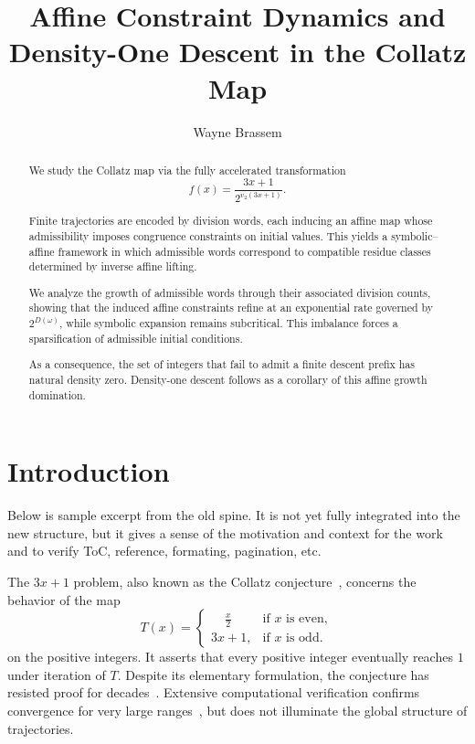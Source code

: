 \documentclass[12pt, oneside]{article}
\title{Affine Constraint Dynamics and Density-One Descent in the Collatz Map}
\author{Wayne Brassem}
\numberwithin{equation}{section}
\theoremstyle{definition}
\theoremstyle{plain}
\theoremstyle{remark}
\begin{document}


\maketitle

\begin{abstract}

We study the Collatz map via the fully accelerated transformation
\[
f(x)=\frac{3x+1}{2^{v_2(3x+1)}}.
\]

Finite trajectories are encoded by division words, each inducing an affine map
whose admissibility imposes congruence constraints on initial values. This
yields a symbolic--affine framework in which admissible words correspond to
compatible residue classes determined by inverse affine lifting.

We analyze the growth of admissible words through their associated division
counts, showing that the induced affine constraints refine at an exponential
rate governed by $2^{D(\omega)}$, while symbolic expansion remains subcritical.
This imbalance forces a sparsification of admissible initial conditions.

As a consequence, the set of integers that fail to admit a finite descent prefix
has natural density zero. Density-one descent follows as a corollary of this
affine growth domination.

\end{abstract}

\newpage
\tableofcontents

\newpage
\section{Introduction}

Below is sample excerpt from the old spine. It is not yet fully integrated into
the new structure, but it gives a sense of the motivation and context for the work and
to verify ToC, reference, formating, pagination, etc.

The $3x+1$ problem, also known as the Collatz conjecture~\cite{Collatz1937}, concerns
the behavior of the map
\[
T(x) =
\begin{cases}
\displaystyle
    \phantom{3x} \frac{x}{2} & \text {if } x \text{ is even}, \\[8pt]
\displaystyle
    3x+1,                    & \text{if $x$ is odd}.
\end{cases}
\]
on the positive integers. It asserts that every positive integer eventually reaches $1$
under iteration of $T$. Despite its elementary formulation, the conjecture has resisted
proof for decades~\cite{Lagarias2010,Terras1976}. Extensive computational verification
confirms convergence for very large ranges~\cite{OliveiraESilva2010}, but does not
illuminate the global structure of trajectories.
\end{document}
